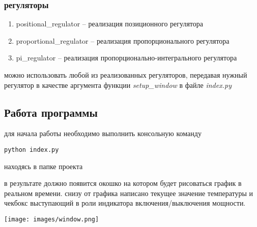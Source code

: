 \documentclass{article}
\begin{document}
\subsubsection{регуляторы}
\begin{enumerate}
    \item positional\_regulator -- реализация позиционного регулятора
    \item proportional\_regulator -- реализация пропорционального регулятора
    \item pi\_regulator -- реализация пропорционально-интегрального регулятора
\end{enumerate}

можно использовать любой из реализованных регуляторов, передавая нужный регулятор в качестве аргумента функции \textit{setup\_window} в файле \textit{index.py}

\subsection{Работа программы}
для начала работы необходимо выполнить консольную команду 

\begin{lstlisting}
python index.py
\end{lstlisting}

находясь в папке проекта

в результате должно появится окошко на котором будет рисоваться график в реальном времени. снизу от графика написано текущее значение температуры и чекбокс выступающий в роли индикатора включения/выключения мощности.

\texttt{[image: images/window.png]}
\end{document}
